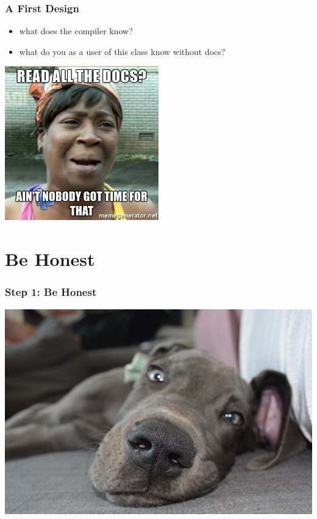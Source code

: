 \documentclass{beamer}
\begin{document}
\begin{frame}
\begin{columns}
\begin{column}{0.4\textwidth}
    \end{column}
  \end{columns}
\end{frame}

\begin{frame}
  \inputminted[fontsize=\small, firstline=3]{scala}{../src/main/scala/de/codecentric/zero/VendingMachine.scala}
\end{frame}

\begin{frame}
  \frametitle{A First Design}
  \begin{itemize}
  \item what does the compiler know?
  \item what do you as a user of this class know without docs?
  \end{itemize}
  \begin{center}
    \includegraphics[width=0.5\textwidth]{../pics/docs.jpg}
  \end{center}
\end{frame}

\section{Be Honest}

\begin{frame}
  \frametitle{Step 1: Be Honest}
  \begin{center}
    \includegraphics[width=\textwidth]{../pics/dog.jpg}
  \end{center}
\end{frame}
\end{document}
